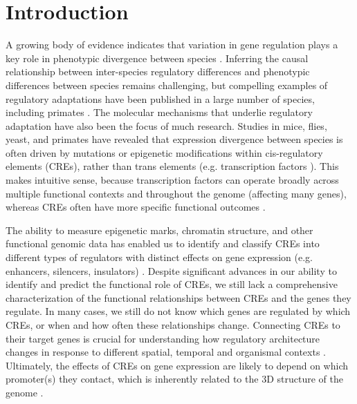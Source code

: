 \section{Introduction}\label{ch02-introduction}
A growing body of evidence indicates that variation in gene regulation plays a key role in phenotypic divergence between species \cite{Britten.1971, King.1975, Carroll.2005, Gilad.2006, Wray.2007, Blekhman.2008, Karaman.2003}. Inferring the causal relationship between inter-species regulatory differences and phenotypic differences between species remains challenging, but compelling examples of regulatory adaptations have been published in a large number of species, including primates \cite{Prabhakar.2008, Babbitt.2010, Warner.2009, Loisel.2006, Rockman.2005, Pollard.2006}. The molecular mechanisms that underlie regulatory adaptation have also been the focus of much research. Studies in mice, flies, yeast, and primates have revealed that expression divergence between species is often driven by mutations or epigenetic modifications within cis-regulatory elements (CREs), rather than trans elements (e.g. transcription factors \cite{Wray.2007, Prabhakar.2008, Babbitt.2010, Warner.2009, Loisel.2006, Rockman.2005, Pennacchio.2013, Ong.2011}). This makes intuitive sense, because transcription factors can operate broadly across multiple functional contexts and throughout the genome (affecting many genes), whereas CREs often have more specific functional outcomes \cite{Carroll.2005, Wilson.2009}.

The ability to measure epigenetic marks, chromatin structure, and other functional genomic data has enabled us to identify and classify CREs into different types of regulators with distinct effects on gene expression (e.g. enhancers, silencers, insulators) \cite{Allis.2016, consortium.2012a, Won.2008}. Despite significant advances in our ability to identify and predict the functional role of CREs, we still lack a comprehensive characterization of the functional relationships between CREs and the genes they regulate. In many cases, we still do not know which genes are regulated by which CREs, or when and how often these relationships change. Connecting CREs to their target genes is crucial for understanding how regulatory architecture changes in response to different spatial, temporal and organismal contexts \cite{Ong.2011, Allis.2016, consortium.2012a, Won.2008, Levine.2010, Dowell.2011, Fagerberg.2014}. Ultimately, the effects of CREs on gene expression are likely to depend on which promoter(s) they contact, which is inherently related to the 3D structure of the genome \cite{Fukaya.2016, Huang.2017}.

